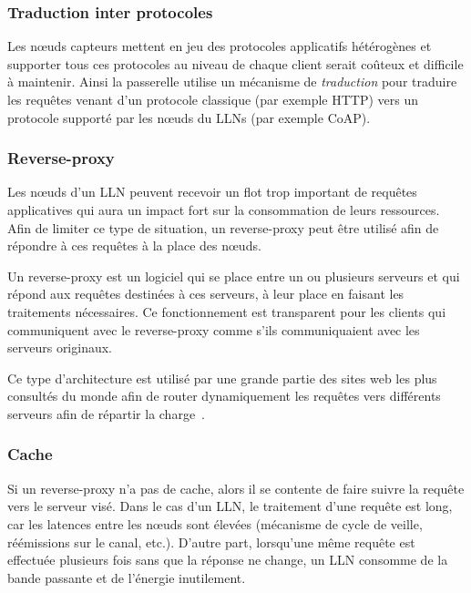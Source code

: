 \subsubsection*{Traduction inter protocoles}

Les nœuds capteurs mettent en jeu des protocoles applicatifs hétérogènes et supporter tous ces protocoles au niveau de chaque client serait coûteux et difficile à maintenir.
Ainsi la passerelle utilise un mécanisme de \emph{traduction} pour traduire les requêtes venant d'un protocole classique (par exemple \ac{HTTP}) vers un protocole supporté par les nœuds du \ac{LLN}s (par exemple \acl{CoAP}).

\subsubsection*{Reverse-proxy}

Les nœuds d'un \ac{LLN} peuvent recevoir un flot trop important de requêtes applicatives qui aura un impact fort sur la consommation de leurs ressources.
Afin de limiter ce type de situation, un reverse-proxy peut être utilisé afin de répondre à ces requêtes à la place des nœuds.

Un reverse-proxy est un logiciel qui se place entre un ou plusieurs serveurs et qui répond aux requêtes destinées à ces serveurs, à leur place en faisant les traitements nécessaires.
Ce fonctionnement est transparent pour les clients qui communiquent avec le reverse-proxy comme s'ils communiquaient avec les serveurs originaux.

Ce type d'architecture est utilisé par une grande partie des sites web les plus consultés du monde afin de router dynamiquement les requêtes vers différents serveurs afin de répartir la charge~\cite{reese2008nginx,guinard2010resource}.

\subsubsection*{Cache}

Si un reverse-proxy n'a pas de cache, alors il se contente de faire suivre la requête vers le serveur visé.
Dans le cas d'un \ac{LLN}, le traitement d'une requête est long, car les latences entre les nœuds sont élevées (mécanisme de cycle de veille, réémissions sur le canal, etc.).
D'autre part, lorsqu'une même requête est effectuée plusieurs fois sans que la réponse ne change, un \ac{LLN} consomme de la bande passante et de l'énergie inutilement.

